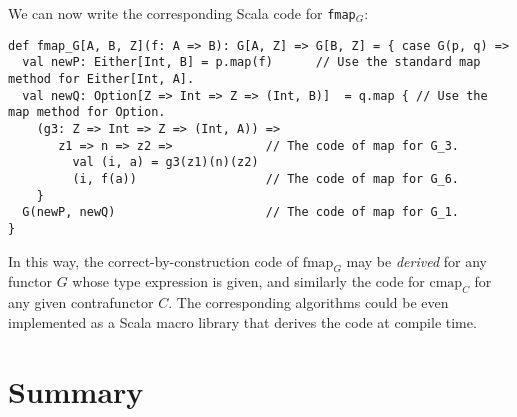 We can now write the corresponding Scala code for \lstinline!fmap!$_{G}$:
\begin{lstlisting}
def fmap_G[A, B, Z](f: A => B): G[A, Z] => G[B, Z] = { case G(p, q) =>
  val newP: Either[Int, B] = p.map(f)      // Use the standard map method for Either[Int, A].
  val newQ: Option[Z => Int => Z => (Int, B)]  = q.map { // Use the map method for Option.
    (g3: Z => Int => Z => (Int, A)) => 
       z1 => n => z2 =>             // The code of map for G_3.
         val (i, a) = g3(z1)(n)(z2)
         (i, f(a))                  // The code of map for G_6.
    }
  G(newP, newQ)                     // The code of map for G_1.
}
\end{lstlisting}

In this way, the correct-by-construction code of $\text{fmap}_{G}$
may be \emph{derived} for any functor $G$ whose type expression is
given, and similarly the code for $\text{cmap}_{C}$ for any given
contrafunctor $C$. The corresponding algorithms could be even implemented
as a Scala macro library that derives the code at compile time.

\section{Summary}

